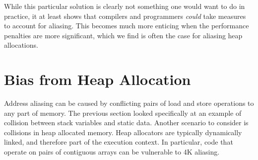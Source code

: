 \documentclass[a4paper,10pt,twocolumn,twoside]{article}
\begin{document}
While this particular solution is clearly not something one would want to do in practice, it at least shows that compilers and programmers \emph{could} take measures to account for aliasing.
This becomes much more enticing when the performance penalties are more significant, which we find is often the case for aliasing heap allocations.



\section{Bias from Heap Allocation}

Address aliasing can be caused by conflicting pairs of load and store operations to any part of memory.
The previous section looked specifically at an example of collision between stack variables and static data.
Another scenario to consider is collisions in heap allocated memory.
Heap allocators are typically dynamically linked, and therefore part of the execution context.
In particular, code that operate on pairs of contiguous arrays can be vulnerable to 4K aliasing.
\end{document}
